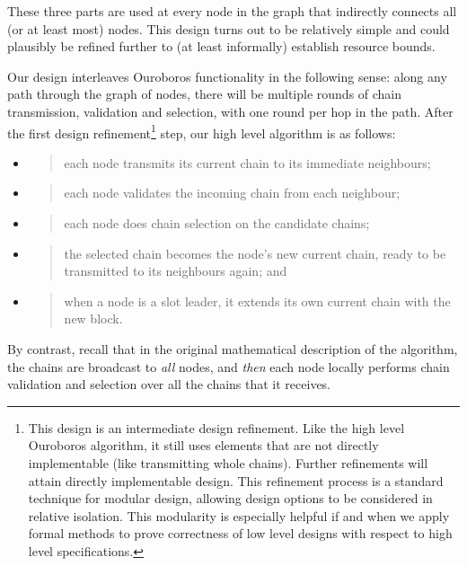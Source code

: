 \documentclass[11pt,a4paper]{article}
\begin{document}
These three parts are used at every node in the graph that indirectly
connects all (or at least most) nodes. This design turns out to be
relatively simple and could plausibly be refined further to (at least
informally) establish resource bounds.

Our design interleaves Ouroboros functionality in the following sense:
along any path through the graph of nodes, there will be multiple rounds
of chain transmission, validation and selection, with one round per hop
in the path. After the first design refinement\footnote{This design is
  an intermediate design refinement. Like the high level Ouroboros
  algorithm, it still uses elements that are not directly implementable
  (like transmitting whole chains). Further refinements will attain
  directly implementable design. This refinement process is a standard
  technique for modular design, allowing design options to be considered
  in relative isolation. This modularity is especially helpful if and
  when we apply formal methods to prove correctness of low level designs
  with respect to high level specifications.} step, our high level
algorithm is as follows:

\begin{itemize}
\item
  \begin{quote}
  each node transmits its current chain to its immediate neighbours;
  \end{quote}
\item
  \begin{quote}
  each node validates the incoming chain from each neighbour;
  \end{quote}
\item
  \begin{quote}
  each node does chain selection on the candidate chains;
  \end{quote}
\item
  \begin{quote}
  the selected chain becomes the node's new current chain, ready to be
  transmitted to its neighbours again; and
  \end{quote}
\item
  \begin{quote}
  when a node is a slot leader, it extends its own current chain with
  the new block.
  \end{quote}
\end{itemize}

By contrast, recall that in the original mathematical description of the
algorithm, the chains are broadcast to \emph{all} nodes, and \emph{then}
each node locally performs chain validation and selection over all the
chains that it receives.
\end{document}
